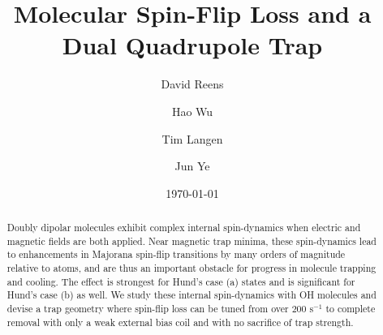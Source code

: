 \documentclass[%
 reprint,
groupedaddress,
 amsmath,amssymb,
 aps,
prl,
]{revtex4-1}
\begin{document}

\title{Molecular Spin-Flip Loss and a Dual Quadrupole Trap}%

\author{David Reens}
%
\author{Hao Wu}
\author{Tim Langen}%
\author{Jun Ye}
%

\date{\today}%


\begin{abstract}
Doubly dipolar molecules exhibit complex internal spin-dynamics when electric and magnetic fields are both applied. Near magnetic trap minima, these spin-dynamics lead to enhancements in Majorana spin-flip transitions by many orders of magnitude relative to atoms, and are thus an important obstacle for progress in molecule trapping and cooling. The effect is strongest for Hund's case (a) states and is significant for Hund's case (b) as well. We study these internal spin-dynamics with OH molecules and devise a trap geometry where spin-flip loss can be tuned from over $200 \text{ s}^{-1} $ to complete removal with only a weak external bias coil and with no sacrifice of trap strength.
\end{abstract}


\maketitle
\end{document}
